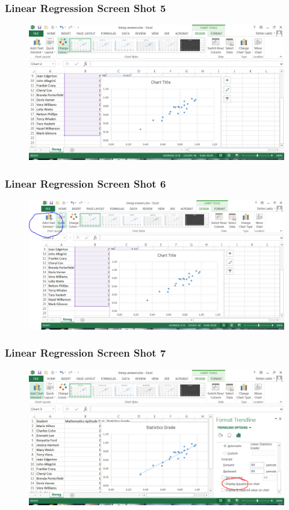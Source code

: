 \documentclass[xcolor=dvipsnames]{beamer}
\begin{document}
\begin{frame}
  \frametitle{Linear Regression Screen Shot 5}
  \begin{figure}[h]
    \includegraphics[scale=.42]{./linreg04.png}
  \end{figure}
\end{frame}

\begin{frame}
  \frametitle{Linear Regression Screen Shot 6}
  \begin{figure}[h]
    \includegraphics[scale=.42]{./linreg05.png}
  \end{figure}
\end{frame}

\begin{frame}
  \frametitle{Linear Regression Screen Shot 7}
  \begin{figure}[h]
    \includegraphics[scale=.42]{./linreg09.png}
  \end{figure}
\end{frame}
\end{document}
